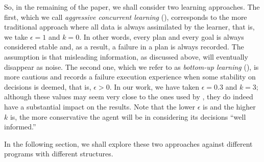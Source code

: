 So, in the remaining of the paper, we shall consider two learning approaches. The
first, which we call \emph{aggressive concurrent learning} (\CL), corresponds to
the more traditional approach where all data is always assimilated by the
learner, that is, we take $\epsilon = 1$ and $k = 0$. In other words, every plan
and every goal is always considered stable and, as a result, a failure in a plan
is always recorded. The assumption is that misleading information, as
discussed above, will eventually disappear as noise.
The second one, which we refer to as \emph{bottom-up learning} (\BUL), is more
cautious and records a failure execution experience when some stability on
decisions is deemed, that is, $\epsilon > 0$. In our work, we have taken
$\epsilon = 0.3$ and $k = 3$; although these values may seem very close to the
ones used by \CL, they do indeed have a substantial impact on the results.
Note that the lower $\epsilon$ is and the higher $k$ is, the more
conservative the agent will be in considering its decisions ``well informed.'' 
%

In the following section, we shall explore these two approaches against
different programs with different structures.




